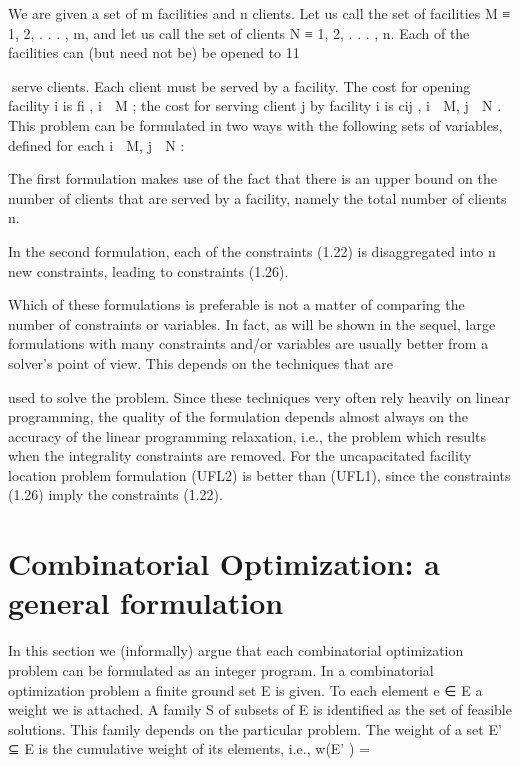 \documentclass[titlepage]{book}
\begin{document}
We are given a set of m facilities and n clients. Let us call the set of facilities M ≡ {1, 2, . . . , m}, and
let us call the set of clients N ≡ {1, 2, . . . , n}. Each of the facilities can (but need not be) be opened to
11

serve clients. Each client must be served by a facility. The cost for opening facility i is fi , i ∈ M ; the
cost for serving client j by facility i is cij , i ∈ M, j ∈ N . This problem can be formulated in two ways
with the following sets of variables, defined for each i ∈ M, j ∈ N :


The first formulation makes use of the fact that there is an upper bound on the number of clients that
are served by a facility, namely the total number of clients n.


In the second formulation, each of the constraints (1.22) is disaggregated into n new constraints, leading
to constraints (1.26).


Which of these formulations is preferable is not a matter of comparing the number of constraints or
variables. In fact, as will be shown in the sequel, large formulations with many constraints and/or
variables are usually better from a solver's point of view. This depends on the techniques that are

used to solve the problem. Since these techniques very often rely heavily on linear programming, the
quality of the formulation depends almost always on the accuracy of the linear programming relaxation,
i.e., the problem which results when the integrality constraints are removed. For the uncapacitated
facility location problem formulation (UFL2) is better than (UFL1), since the constraints (1.26) imply
the constraints (1.22).

\section{Combinatorial Optimization: a general formulation}

In this section we (informally) argue that each combinatorial optimization problem can be formulated
as an integer program. In a combinatorial optimization problem a finite ground set E is given. To each
element e ∈ E a weight we is attached. A family S of subsets of E is identified as the set of feasible
solutions. This family depends on the particular problem. The weight of a set E' ⊆ E is the cumulative
weight of its elements, i.e., w(E' ) =
\end{document}
